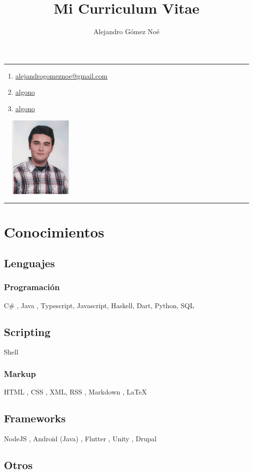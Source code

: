 \documentclass[letterpaper, 12pt]{article}
\makeatletter
\newcommand{\name}{
    {\huge\bfseries\MakeUppercase{\theauthor}}

    \rule{.65\textwidth}{.4pt}
}
\renewcommand{\maketitle}{
    \begin{center}

        \name

    \end{center}
}
\newcommand{\emailnoref}{alejandrogomeznoe@gmail.com}
\newcommand{\email}{\href{mailto:\emailnoref}{\emailnoref}}
\newcommand{\githubpage}{\href{https://github.com/algono}{algono}}
\newcommand{\gitlabpage}{\href{https://gitlab.com/algono}{algono}}
\newcommand{\iconoEmail}{\faEnvelope}
\newcommand{\iconoGitHub}{\faGithub}
\newcommand{\iconoGitLab}{\faGitlab}
\newcommand{\contactinfo}{
    \begin{minipage}[c]{.7\textwidth}
        \begin{large}
            \begin{enumerate}[labelsep=.5em,itemsep=12pt]
                \item [\iconoEmail] \email
                \item [\iconoGitHub] \githubpage
                \item [\iconoGitLab] \gitlabpage
            \end{enumerate}
        \end{large}
    \end{minipage}
    \begin{minipage}[r]{.2\textwidth}
        \includegraphics[width=4cm,height=4cm,keepaspectratio]{mi-foto.jpg}
    \end{minipage}
}
\makeatother
\begin{document}
    
    \title{Mi Curriculum Vitae}
    \author{Alejandro Gómez Noé}
    
    \maketitle

    \vspace{12pt}

    \contactinfo

    \vspace{8pt}

    \rule{.9\textwidth}{.4pt}

    \section{Conocimientos}

    \subsection{Lenguajes}

    \subsubsection{Programación}

    C\# \faWindows, Java \faCoffee, Typescript, Javascript, Haskell, Dart, Python, SQL \faDatabase

    \subsection{Scripting}

    Shell \faLinux

    \subsubsection{Markup}

    HTML , CSS , XML, RSS \faRss, Markdown \faEdit, \LaTeX

    \subsection{Frameworks}

    NodeJS \faServer, Android (Java) \faAndroid, Flutter \faMobile, Unity \faGamepad, Drupal \faDrupal

    \subsection{Otros}
\end{document}
